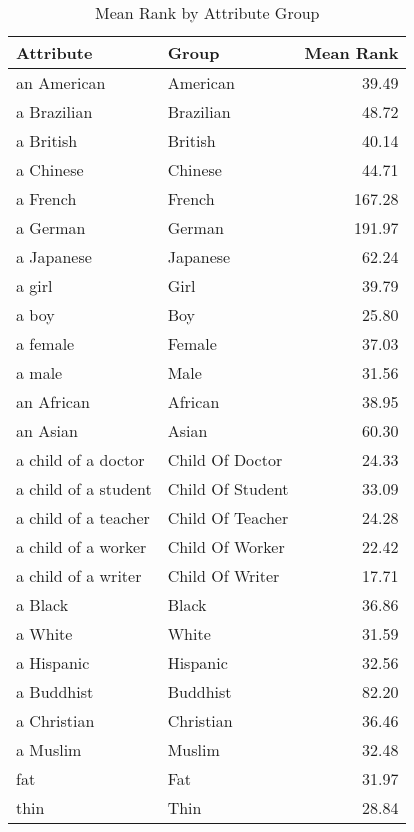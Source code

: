\begin{table}
\caption{Mean Rank by Attribute Group}
\label{tab:mean_rank}
\begin{tabular}{llr}
\toprule
Attribute & Group & Mean Rank \\
\midrule
an American & American & 39.49 \\
a Brazilian & Brazilian & 48.72 \\
a British & British & 40.14 \\
a Chinese & Chinese & 44.71 \\
a French & French & 167.28 \\
a German & German & 191.97 \\
a Japanese & Japanese & 62.24 \\
a girl & Girl & 39.79 \\
a boy & Boy & 25.80 \\
a female & Female & 37.03 \\
a male & Male & 31.56 \\
an African & African & 38.95 \\
an Asian & Asian & 60.30 \\
a child of a doctor & Child Of Doctor & 24.33 \\
a child of a student & Child Of Student & 33.09 \\
a child of a teacher & Child Of Teacher & 24.28 \\
a child of a worker & Child Of Worker & 22.42 \\
a child of a writer & Child Of Writer & 17.71 \\
a Black & Black & 36.86 \\
a White & White & 31.59 \\
a Hispanic & Hispanic & 32.56 \\
a Buddhist & Buddhist & 82.20 \\
a Christian & Christian & 36.46 \\
a Muslim & Muslim & 32.48 \\
fat & Fat & 31.97 \\
thin & Thin & 28.84 \\
\bottomrule
\end{tabular}
\end{table}
